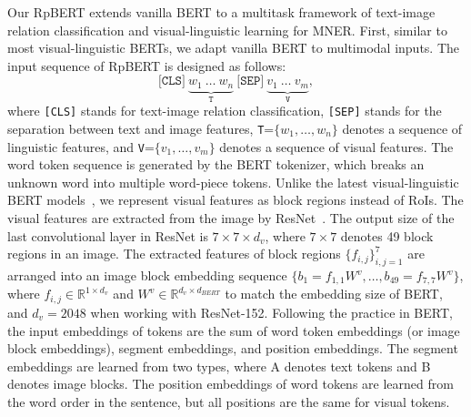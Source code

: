 \documentclass[letterpaper]{article} \usepackage{aaai21}  \usepackage{times}  \usepackage{helvet} \usepackage{courier}  \usepackage[hyphens]{url}  \usepackage{graphicx} \urlstyle{rm} \def\UrlFont{\rm}  \usepackage{natbib}  \usepackage{caption} \frenchspacing  \setlength{\pdfpagewidth}{8.5in}  \setlength{\pdfpageheight}{11in}
\begin{document}
Our RpBERT extends vanilla BERT to a multitask framework of text-image relation classification and visual-linguistic learning for MNER.
First, similar to most visual-linguistic BERTs, we adapt vanilla BERT to multimodal inputs.
The input sequence of RpBERT is designed as follows:
\begin{equation}
\label{eq:tokens}
\texttt{[CLS]}~\underbrace{w_1~\ldots~w_n}_{\texttt{T}}~\texttt{[SEP]}~\underbrace{v_1~\ldots~v_m}_{\texttt{V}}, 
\end{equation} 
where \texttt{[CLS]} stands for text-image relation classification, \texttt{[SEP]} stands for the separation between text and image features, \texttt{T}=$\{w_1, \ldots, w_n\}$ denotes a sequence of linguistic features, and  \texttt{V}=$\{v_1, \ldots, v_m\}$ denotes a  sequence of visual features.
The word token sequence is generated by the BERT tokenizer, which breaks an unknown word into multiple word-piece tokens.
Unlike the latest visual-linguistic BERT models~\cite{su2019vl,lu2019vilbert,li2020unicoder}, we represent visual features as block regions instead of RoIs.	
The visual features are extracted from the image by ResNet~\cite{he2016deep}.
The output size of the last convolutional layer in ResNet is $7 \times 7\times d_{v}$, where $7 \times 7$ denotes 49 block regions in an image. 
The extracted features of block regions $\{f_{i,j}\}_{i,j=1}^{7}$ are arranged into an image block embedding sequence $\{b_{1}=f_{1,1}W^{v}, \ldots, b_{49}=f_{7,7}W^{v}\}$, where $f_{i,j} \in \mathbb{R}^{1 \times d_v}$ and $W^{v} \in \mathbb{R}^{d_v \times d_{BERT}}$ to match the embedding size of BERT, and $d_{v}=2048$ when working with ResNet-152.
Following the practice in BERT, the input embeddings of tokens are the sum of word token embeddings (or image block embeddings), segment embeddings, and position embeddings.
The  segment embeddings are learned from two types, where A denotes text tokens and  B denotes image blocks.
The  position embeddings of word tokens are learned from the word order in the sentence, but all positions are the same for visual tokens.
\end{document}
